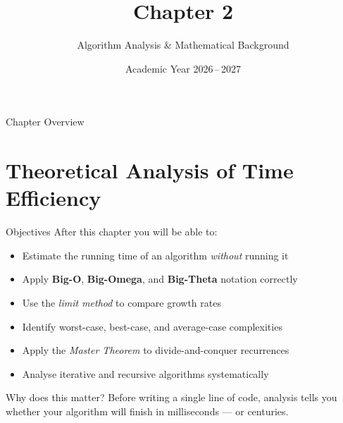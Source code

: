 \documentclass[aspectratio=169]{beamer}
\title[Ch.\,2 -- Algorithm Analysis]{Chapter 2}
\subtitle{Algorithm Analysis \& Mathematical Background}
\date{Academic Year 2026\,--\,2027}
\begin{document}
\begin{frame}[plain]\titlepage\end{frame}

\begin{frame}{Chapter Overview}
  \begin{center}
    \begin{minipage}{0.85\textwidth}
      \tableofcontents[hideallsubsections,sectionstyle=show/shaded]
    \end{minipage}
  \end{center}
\end{frame}

\section{Theoretical Analysis of Time Efficiency}

\begin{frame}[shrink=12]{Objectives}
  After this chapter you will be able to:
  \begin{itemize}
    \item Estimate the running time of an algorithm \emph{without} running it
        \item Apply \textbf{Big-O}, \textbf{Big-Omega}, and
          \textbf{Big-Theta} notation correctly
    \item Use the \emph{limit method} to compare growth rates
    \item Identify worst-case, best-case, and average-case complexities
    \item Apply the \emph{Master Theorem} to divide-and-conquer recurrences
    \item Analyse iterative and recursive algorithms systematically
  \end{itemize}
  \vspace{0.4em}
  \begin{block}{Why does this matter?}
    Before writing a single line of code, analysis tells you whether your
    algorithm will finish in milliseconds — or centuries.
  \end{block}
\end{frame}
\end{document}
